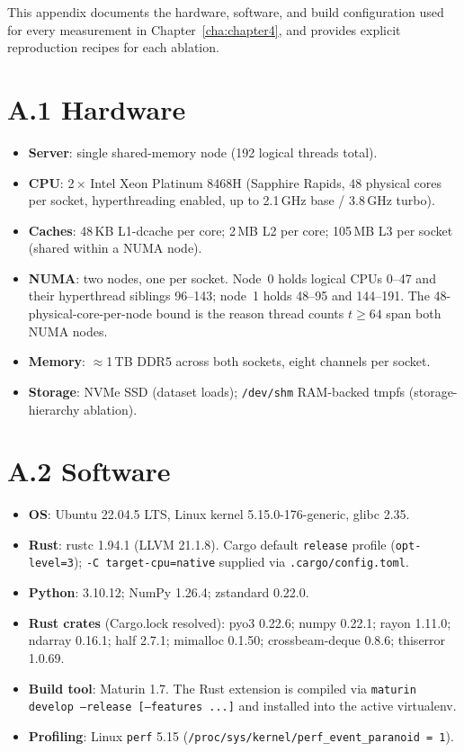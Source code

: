 \label{app:reproduction}

This appendix documents the hardware, software, and build configuration used for every measurement in Chapter~\ref{cha:chapter4}, and provides explicit reproduction recipes for each ablation.

\section*{A.1 Hardware}

\begin{itemize}
  \item \textbf{Server}: single shared-memory node (192 logical threads total).
  \item \textbf{CPU}: 2\,$\times$ Intel Xeon Platinum 8468H (Sapphire Rapids, 48 physical cores per socket, hyperthreading enabled, up to 2.1\,GHz base / 3.8\,GHz turbo).
  \item \textbf{Caches}: 48\,KB L1-dcache per core; 2\,MB L2 per core; 105\,MB L3 per socket (shared within a NUMA node).
  \item \textbf{NUMA}: two nodes, one per socket. Node~0 holds logical CPUs 0--47 and their hyperthread siblings 96--143; node~1 holds 48--95 and 144--191. The 48-physical-core-per-node bound is the reason thread counts $t \geq 64$ span both NUMA nodes.
  \item \textbf{Memory}: $\approx$1\,TB DDR5 across both sockets, eight channels per socket.
  \item \textbf{Storage}: NVMe SSD (dataset loads); \texttt{/dev/shm} RAM-backed tmpfs (storage-hierarchy ablation).
\end{itemize}

\section*{A.2 Software}

\begin{itemize}
  \item \textbf{OS}: Ubuntu 22.04.5 LTS, Linux kernel 5.15.0-176-generic, glibc 2.35.
  \item \textbf{Rust}: rustc 1.94.1 (LLVM 21.1.8). Cargo default \texttt{release} profile (\texttt{opt-level=3}); \texttt{-C target-cpu=native} supplied via \texttt{.cargo/config.toml}.
  \item \textbf{Python}: 3.10.12; NumPy 1.26.4; zstandard 0.22.0.
  \item \textbf{Rust crates} (Cargo.lock resolved): pyo3 0.22.6; numpy 0.22.1; rayon 1.11.0; ndarray 0.16.1; half 2.7.1; mimalloc 0.1.50; crossbeam-deque 0.8.6; thiserror 1.0.69.
  \item \textbf{Build tool}: Maturin 1.7. The Rust extension is compiled via \texttt{maturin develop --release [--features ...]} and installed into the active virtualenv.
  \item \textbf{Profiling}: Linux \texttt{perf} 5.15 (\texttt{/proc/sys/kernel/perf\_event\_paranoid = 1}).
\end{itemize}

